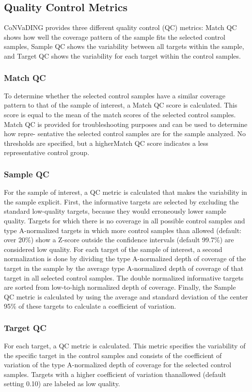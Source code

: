 \subsection{Quality Control Metrics}
CoNVaDING provides three different quality control (QC) metrics: Match QC shows how well the coverage pattern of the sample fits the selected control samples, Sample QC shows the variability between all targets within the sample, and Target QC shows the variability for each target within the control samples.

\subsubsection{Match QC}
To determine whether the selected control samples have a similar coverage pattern to that of the sample of interest, a Match QC score is calculated. This score is equal to the mean of the match scores of the selected control samples. 
Match QC is provided for troubleshooting purposes and can be used to determine how repre- sentative the selected control samples are for the sample analyzed. 
No thresholds are specified, but a higherMatch QC score indicates a less representative control group.

\subsubsection{Sample QC}
For the sample of interest, a QC metric is calculated that makes the variability in the sample explicit. 
First, the informative targets are selected by excluding the standard low-quality targets, because they would erroneously lower sample quality. 
Targets for which there is no coverage in all possible control samples and type A-normalized targets in which more control samples than allowed (default: over 20\%) show a Z-score outside the confidence intervals (default 99.7\%) are considered low quality. 
For each target of the sample of interest, a second normalization is done by dividing the type A-normalized depth of coverage of the target in the sample by the average type A-normalized depth of coverage of that target in all selected control samples. 
The double normalized informative targets are sorted from low-to-high normalized depth of coverage. 
Finally, the Sample QC metric is calculated by using the average and standard deviation of the center 95\% of these targets to calculate a coefficient of variation.

\subsubsection{Target QC}
For each target, a QC metric is calculated. This metric specifies the variability of the specific target in the control samples and consists of the coefficient of variation of the type A-normalized depth of coverage for the selected control samples. 
Targets with a higher coefficient of variation thanallowed (default setting 0.10) are labeled as low quality.


